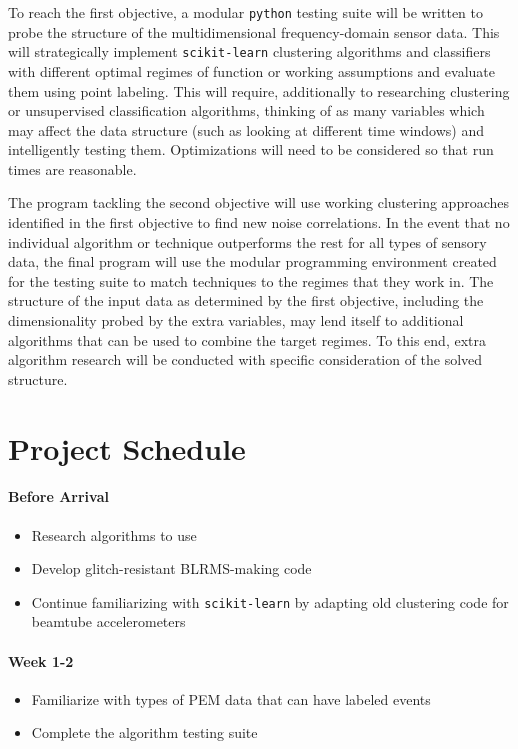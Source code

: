 \documentclass[colorlinks=true,pdfstartview=FitV,linkcolor=blue,
            citecolor=red,urlcolor=magenta]{ligodoc}
\begin{document}
To reach the first objective, a modular \texttt{python} testing suite will be written to probe the structure of the multidimensional frequency-domain sensor data.
This will strategically implement \texttt{scikit-learn} clustering algorithms and classifiers with different optimal regimes of function or working assumptions and evaluate them using point labeling. 
This will require, additionally to researching clustering or unsupervised classification algorithms, thinking of as many variables which may affect the data structure (such as looking at different time windows) and intelligently testing them. 
Optimizations will need to be considered so that run times are reasonable.

The program tackling the second objective will use working clustering approaches identified in the first objective to find new noise correlations.
In the event that no individual algorithm or technique outperforms the rest for all types of sensory data, the final program will use the modular programming environment created for the testing suite to match techniques to the regimes that they work in.
The structure of the input data as determined by the first objective, including the dimensionality probed by the extra variables, may lend itself to additional algorithms that can be used to combine the target regimes.
To this end, extra algorithm research will be conducted with specific consideration of the solved structure.


\section{Project Schedule}
\paragraph{Before Arrival}
\begin{itemize}
\item Research algorithms to use
\item Develop glitch-resistant BLRMS-making code
\item Continue familiarizing with \texttt{scikit-learn} by adapting old clustering code for beamtube accelerometers
\end{itemize}
\paragraph{Week 1-2}
\begin{itemize}
\item Familiarize with types of PEM data that can have labeled events
\item Complete the algorithm testing suite
\end{itemize}
\end{document}
